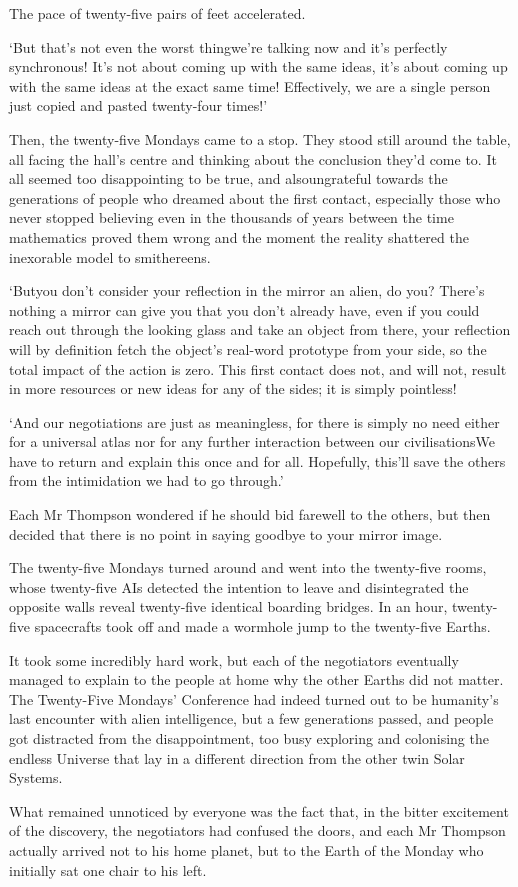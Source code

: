 The pace of twenty-five pairs of feet accelerated.

`But that's not even the worst thing\textemdash we're talking now
and it's perfectly synchronous! It's not about coming up with the same
ideas, it's about coming up with the same ideas at the exact same
time!  Effectively, we are a single person just copied and pasted
twenty-four times!'

Then, the twenty-five Mondays came to a stop. They stood still around
the table, all facing the hall's centre and thinking about the
conclusion they'd come to. It all seemed too disappointing to be true,
and also\textellipsis ungrateful towards the generations of people
who dreamed about the first contact, especially those who never
stopped believing even in the thousands of years between the time
mathematics proved them wrong and the moment the reality shattered the
inexorable model to smithereens.

`But\textellipsis you don't consider your reflection in the mirror an
alien, do you? There's nothing a mirror can give you that you don't
already have, even if you could reach out through the looking glass
and take an object from there, your reflection will by definition
fetch the object's real-word prototype from your side, so the total
impact of the action is zero. This first contact does not, and will
not, result in more resources or new ideas for any of the sides; it is
simply pointless!

`And our negotiations are just as meaningless, for there is simply no
need either for a universal atlas nor for any further interaction
between our civilisations\textellipsis We have to return and explain
this once and for all. Hopefully, this'll save the others from the
intimidation we had to go through.'

Each Mr Thompson wondered if he should bid farewell to the others, but
then decided that there is no point in saying goodbye to your mirror
image.

The twenty-five Mondays turned around and went into the twenty-five
rooms, whose twenty-five AIs detected the intention to leave and
disintegrated the opposite walls reveal twenty-five identical boarding
bridges. In an hour, twenty-five spacecrafts took off and made a
wormhole jump to the twenty-five Earths.

\hsep

It took some incredibly hard work, but each of the negotiators
eventually managed to explain to the people at home why the other
Earths did not matter. The Twenty-Five Mondays' Conference had indeed
turned out to be humanity's last encounter with alien intelligence,
but a few generations passed, and people got distracted from the
disappointment, too busy exploring and colonising the endless Universe
that lay in a different direction from the other twin Solar Systems.

What remained unnoticed by everyone was the fact that, in the bitter
excitement of the discovery, the negotiators had confused the doors,
and each Mr Thompson actually arrived not to his home planet, but to
the Earth of the Monday who initially sat one chair to his left.
